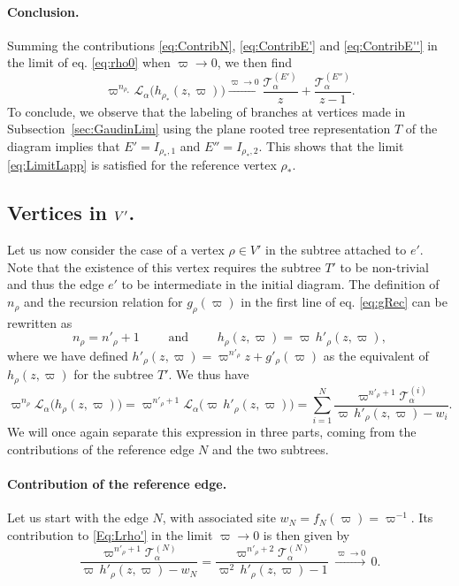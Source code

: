\documentclass{article}
\def\Lc{\mathcal{L}}
\begin{document}
\paragraph{Conclusion.} Summing the contributions \eqref{eq:ContribN}, \eqref{eq:ContribE'} and \eqref{eq:ContribE''} in the limit of eq. \eqref{eq:rho0} when $\varpi\to0$, we then find
\begin{equation}
\varpi^{n_{\rho_\ast}} \Lc_\alpha \bigl( h_{\rho_\ast}(z,\varpi) \bigr) \xrightarrow{\varpi\to0} \frac{\mathcal{T}_\alpha^{(E')}}{z} + \frac{\mathcal{T}_\alpha^{(E'')}}{z-1}.
\end{equation}
To conclude, we observe that the labeling of branches at vertices made in Subsection~\ref{sec:GaudinLim} using the plane rooted tree representation $T$ of the diagram implies that $E'=I_{\rho_\ast,1}$ and $E''=I_{\rho_\ast,2}$. This shows that the limit \eqref{eq:LimitLapp} is satisfied for the reference vertex $\rho_\ast$.

\subsection{Vertices in \texorpdfstring{$\boldmath{V'}$}{V'}.}

Let us now consider the case of a vertex $\rho \in V'$ in the subtree attached to $e'$. Note that the existence of this vertex requires the subtree $T'$ to be non-trivial and thus the edge $e'$ to be intermediate in the initial diagram. The definition of $n_\rho$ and the recursion relation for $g_\rho(\varpi)$ in the first line of eq. \eqref{eq:gRec} can be rewritten as
\begin{equation}
n_\rho = n'_\rho + 1 \qquad \text{ and } \qquad h_\rho(z,\varpi) = \varpi\,h'_\rho(z,\varpi),
\end{equation}
where we have defined $h'_\rho(z,\varpi)=\varpi^{n'_\rho}z + g'_\rho(\varpi)$ as the equivalent of $h_\rho(z,\varpi)$ for the subtree $T'$. We thus have
\begin{equation}\label{Eq:Lrho'}
\varpi^{n_{\rho}} \Lc_\alpha \bigl( h_\rho(z,\varpi) \bigr) = \varpi^{n'_\rho+1} \Lc_\alpha \bigl( \varpi\,h'_\rho(z,\varpi) \bigr) = \sum_{i=1}^N \frac{\varpi^{n'_\rho+1}\mathcal{T}_\alpha^{(i)}}{\varpi\,h'_\rho(z,\varpi)-w_i}.
\end{equation}
We will once again separate this expression in three parts, coming from the contributions of the reference edge $N$ and the two subtrees.

\paragraph{Contribution of the reference edge.} Let us start with the edge $N$, with associated site $w_N=f_N(\varpi)=\varpi^{-1}$. Its contribution to \eqref{Eq:Lrho'} in the limit $\varpi\to0$ is then given by
\begin{equation}
\frac{\varpi^{n'_\rho+1}\mathcal{T}_\alpha^{(N)}}{\varpi\,h'_\rho(z,\varpi) - w_N} = \frac{\varpi^{n'_\rho+2}\mathcal{T}_\alpha^{(N)}}{\varpi^2\,h'_\rho(z,\varpi) - 1} \; \xrightarrow{\varpi\to 0} \, 0.
\end{equation}
\end{document}
